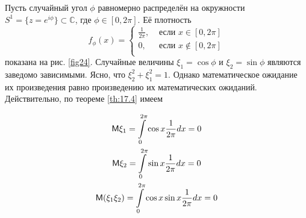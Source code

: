 \begin{example}
\label{ex:17.7}
	Пусть случайный угол $\phi$ равномерно распределён на окружности 
	$S^1 = \{z = e^{i\phi}\} \subset \mathbb{C} $, где $\phi\in [0, 2\pi]$. Её плотность
	\begin{equation*}
		f_{\phi}(x)=
		\begin{cases}
			\frac{1}{2\pi}, &\text{ если } x\in [0,2\pi]\\
			0, &\text{ если } x\notin [0,2\pi]\\
		\end{cases}
	\end{equation*}
	показана на рис. \ref{fig24}. Случайные величины $\xi_1 = \cos\phi$ и $\xi_2 = \sin\phi$ являются заведомо зависимыми. Ясно, что $\xi_2^2+\xi_1^2=1$. Однако математическое ожидание их произведения равно произведению их математических ожиданий.
	Действительно, по теореме \ref{th:17.4} имеем

	\begin{gather*}
		\mathsf{M}\xi_1=\int\limits_0^{2\pi}\cos x\frac{1}{2\pi}dx=0 
		\\
		\mathsf{M}\xi_2=\int\limits_0^{2\pi}\sin x\frac{1}{2\pi}dx=0
		\\
		\mathsf{M}(\xi_1\xi_2)=\int\limits_0^{2\pi}\cos x\sin x\frac{1}{2\pi}dx=0
	\end{gather*}
\end{example}